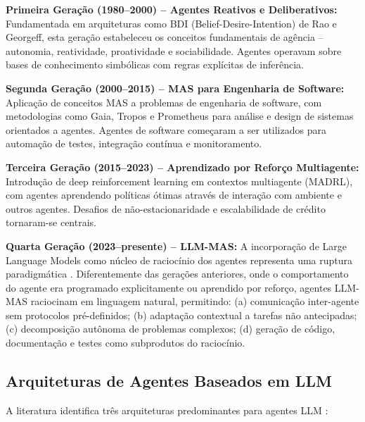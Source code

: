 \documentclass[12pt,a4paper,sumario=tradicional]{abntex2}
\begin{document}
\textbf{Primeira Geração (1980--2000) -- Agentes Reativos e Deliberativos:} Fundamentada em arquiteturas como BDI (Belief-Desire-Intention) de Rao e Georgeff, esta geração estabeleceu os conceitos fundamentais de agência -- autonomia, reatividade, proatividade e sociabilidade. Agentes operavam sobre bases de conhecimento simbólicas com regras explícitas de inferência.

\textbf{Segunda Geração (2000--2015) -- MAS para Engenharia de Software:} Aplicação de conceitos MAS a problemas de engenharia de software, com metodologias como Gaia, Tropos e Prometheus para análise e design de sistemas orientados a agentes. Agentes de software começaram a ser utilizados para automação de testes, integração contínua e monitoramento.

\textbf{Terceira Geração (2015--2023) -- Aprendizado por Reforço Multiagente:} Introdução de deep reinforcement learning em contextos multiagente (MADRL), com agentes aprendendo políticas ótimas através de interação com ambiente e outros agentes. Desafios de não-estacionaridade e escalabilidade de crédito tornaram-se centrais.

\textbf{Quarta Geração (2023--presente) -- LLM-MAS:} A incorporação de Large Language Models como núcleo de raciocínio dos agentes representa uma ruptura paradigmática \cite{rasheed2026llm}. Diferentemente das gerações anteriores, onde o comportamento do agente era programado explicitamente ou aprendido por reforço, agentes LLM-MAS raciocinam em linguagem natural, permitindo: (a) comunicação inter-agente sem protocolos pré-definidos; (b) adaptação contextual a tarefas não antecipadas; (c) decomposição autônoma de problemas complexos; (d) geração de código, documentação e testes como subprodutos do raciocínio.

\subsection{Arquiteturas de Agentes Baseados em LLM}

A literatura identifica três arquiteturas predominantes para agentes LLM \cite{rangel2026codeair, miranda2026bridging}:
\end{document}
